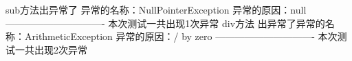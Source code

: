 sub方法出异常了
异常的名称：NullPointerException
异常的原因：null
-------------------------------
本次测试一共出现1次异常
div方法
出异常了异常的名称：ArithmeticException
异常的原因：/ by zero
-------------------------------
本次测试一共出现2次异常
